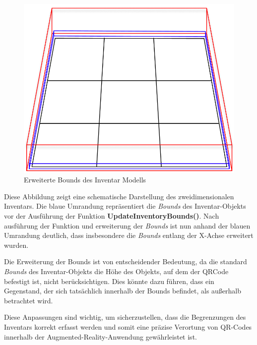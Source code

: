 \begin{figure}[H]
    \centering
    \includegraphics[scale=0.4]{images/extendedBounds}
    \caption{Erweiterte Bounds des Inventar Modells}
    \label{fig:extended_inventoryBounds}
\end{figure}

Diese Abbildung zeigt eine schematische Darstellung des zweidimensionalen Inventars. Die blaue Umrandung repräsentiert
die \textit{Bounds} des Inventar-Objekts vor der Ausführung der Funktion \textbf{UpdateInventoryBounds()}. Nach ausführung
der Funktion und erweiterung der \textit{Bounds} ist nun anhand der blauen Umrandung deutlich, dass insbesondere die
\textit{Bounds} entlang der X-Achse erweitert wurden.

Die Erweiterung der Bounds ist von entscheidender Bedeutung, da die standard \textit{Bounds} des Inventar-Objekts die
Höhe des Objekts, auf dem der QRCode befestigt ist, nicht berücksichtigen. Dies könnte dazu führen, dass ein Gegenstand,
der sich tatsächlich innerhalb der Bounds befindet, als außerhalb betrachtet wird.

Diese Anpassungen sind wichtig, um sicherzustellen, dass die Begrenzungen des Inventars korrekt erfasst werden und somit
eine präzise Verortung von QR-Codes innerhalb der Augmented-Reality-Anwendung gewährleistet ist.

